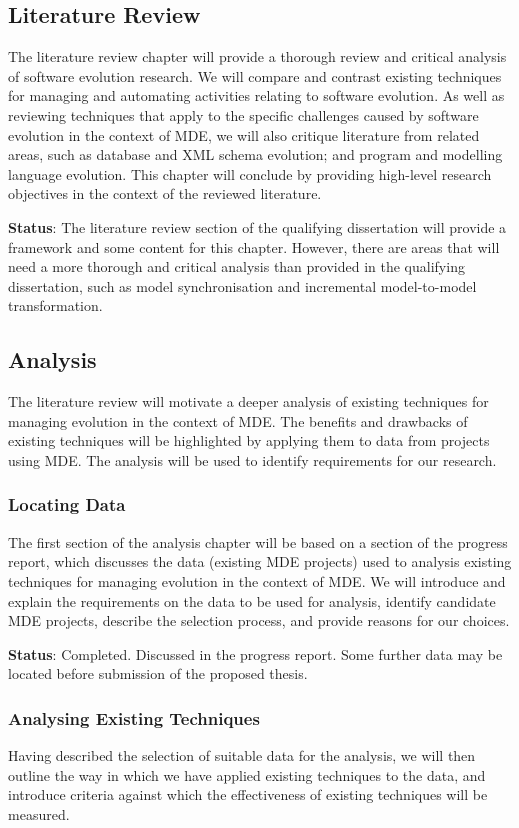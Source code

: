 \subsection{Literature Review}
The literature review chapter will provide a thorough review and critical analysis of software evolution research. We will compare and contrast existing techniques for managing and automating activities relating to software evolution. As well as reviewing techniques that apply to the specific challenges caused by software evolution in the context of MDE, we will also critique literature from related areas, such as database and XML schema evolution; and program and modelling language evolution. This chapter will conclude by providing high-level research objectives in the context of the reviewed literature.

\textbf{Status}: The literature review section of the qualifying dissertation will provide a framework and some content for this chapter. However, there are areas that will need a more thorough and critical analysis than provided in the qualifying dissertation, such as model synchronisation and incremental model-to-model transformation.


\subsection{Analysis}
The literature review will motivate a deeper analysis of existing techniques for managing evolution in the context of MDE. The benefits and drawbacks of existing techniques will be highlighted by applying them to data from projects using MDE. The analysis will be used to identify requirements for our research.

\subsubsection{Locating Data}
The first section of the analysis chapter will be based on a section of the progress report, which discusses the data (existing MDE projects) used to analysis existing techniques for managing evolution in the context of MDE. We will introduce and explain the requirements on the data to be used for analysis, identify candidate MDE projects, describe the selection process, and provide reasons for our choices.

\textbf{Status}: Completed. Discussed in the progress report. Some further data may be located before submission of the proposed thesis.

\subsubsection{Analysing Existing Techniques}
Having described the selection of suitable data for the analysis, we will then outline the way in which we have applied existing techniques to the data, and introduce criteria against which the effectiveness of existing techniques will be measured. 

